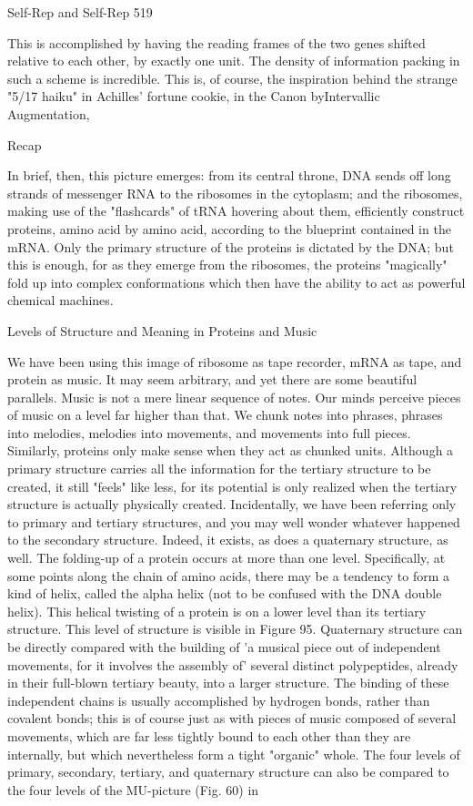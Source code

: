 {Self-Rep and Self-Rep                                                                       519

This is accomplished by having the reading frames of the two genes shifted relative to each
other, by exactly one unit. The density of information packing in such a scheme is incredible.
This is, of course, the inspiration behind the strange "5/17 haiku" in Achilles' fortune cookie,
in the Canon byIntervallic Augmentation,

                                               Recap

In brief, then, this picture emerges: from its central throne, DNA sends off long strands of
messenger RNA to the ribosomes in the cytoplasm; and the ribosomes, making use of the
"flashcards" of tRNA hovering about them, efficiently construct proteins, amino acid by
amino acid, according to the blueprint contained in the mRNA. Only the primary structure of
the proteins is dictated by the DNA; but this is enough, for as they emerge from the
ribosomes, the proteins "magically" fold up into complex conformations which then have the
ability to act as powerful chemical machines.

                  Levels of Structure and Meaning in Proteins and Music

We have been using this image of ribosome as tape recorder, mRNA as tape, and protein as
music. It may seem arbitrary, and yet there are some beautiful parallels. Music is not a mere
linear sequence of notes. Our minds perceive pieces of music on a level far higher than that.
We chunk notes into phrases, phrases into melodies, melodies into movements, and
movements into full pieces. Similarly, proteins only make sense when they act as chunked
units. Although a primary structure carries all the information for the tertiary structure to be
created, it still "feels" like less, for its potential is only realized when the tertiary structure is
actually physically created.
  Incidentally, we have been referring only to primary and tertiary structures, and you may
well wonder whatever happened to the secondary structure. Indeed, it exists, as does a
quaternary structure, as well. The folding-up of a protein occurs at more than one level.
Specifically, at some points along the chain of amino acids, there may be a tendency to form
a kind of helix, called the alpha helix (not to be confused with the DNA double helix). This
helical twisting of a protein is on a lower level than its tertiary structure. This level of
structure is visible in Figure 95. Quaternary structure can be directly compared with the
building of 'a musical piece out of independent movements, for it involves the assembly of'
several distinct polypeptides, already in their full-blown tertiary beauty, into a larger
structure. The binding of these independent chains is usually accomplished by hydrogen
bonds, rather than covalent bonds; this is of course just as with pieces of music composed of
several movements, which are far less tightly bound to each other than they are internally, but
which nevertheless form a tight "organic" whole.
  The four levels of primary, secondary, tertiary, and quaternary structure can also be
compared to the four levels of the MU-picture (Fig. 60) in




}
